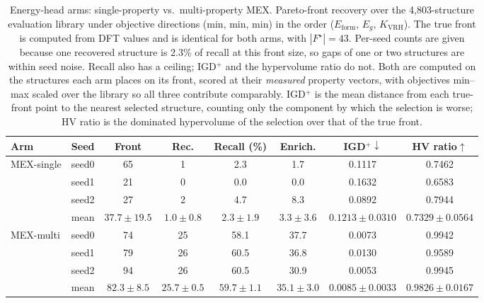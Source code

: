 \begin{table}[htbp]
\renewcommand{\arraystretch}{1.2}
\setlength{\tabcolsep}{4pt}
\caption{Energy-head arms: single-property vs.\ multi-property MEX. Pareto-front recovery over the 4{,}803-structure evaluation library under objective directions (min, min, min) in the order ($E_\mathrm{form}$, $E_g$, $K_\mathrm{VRH}$). The true front is computed from DFT values and is identical for both arms, with $|F^\star|{=}43$. Per-seed counts are given because one recovered structure is 2.3\% of recall at this front size, so gaps of one or two structures are within seed noise. Recall also has a ceiling; IGD$^+$ and the hypervolume ratio do not. Both are computed on the structures each arm places on its front, scored at their \emph{measured} property vectors, with objectives min--max scaled over the library so all three contribute comparably. IGD$^+$ is the mean distance from each true-front point to the nearest selected structure, counting only the component by which the selection is worse; HV ratio is the dominated hypervolume of the selection over that of the true front.}
\label{tab:pareto_arms_mex_heldout}
\centering
\footnotesize
\begin{tabular}{@{}llcccccc@{}}
\hline\hline
\textbf{Arm} & \textbf{Seed} & \textbf{Front} & \textbf{Rec.} & \textbf{Recall (\%)} & \textbf{Enrich.} & \textbf{IGD$^+\downarrow$} & \textbf{HV ratio$\uparrow$} \\
\hline
\multirow{4}{*}{MEX-single}
  & seed0 & 65 & 1 & 2.3 & 1.7 & 0.1117 & 0.7462 \\
  & seed1 & 21 & 0 & 0.0 & 0.0 & 0.1632 & 0.6583 \\
  & seed2 & 27 & 2 & 4.7 & 8.3 & 0.0892 & 0.7944 \\
  & mean & $37.7 \pm 19.5$ & $1.0 \pm 0.8$ & $2.3 \pm 1.9$ & $3.3 \pm 3.6$ & $0.1213 \pm 0.0310$ & $0.7329 \pm 0.0564$ \\
\hline
\multirow{4}{*}{MEX-multi}
  & seed0 & 74 & 25 & 58.1 & 37.7 & 0.0073 & 0.9942 \\
  & seed1 & 79 & 26 & 60.5 & 36.8 & 0.0130 & 0.9589 \\
  & seed2 & 94 & 26 & 60.5 & 30.9 & 0.0053 & 0.9945 \\
  & mean & $82.3 \pm 8.5$ & $25.7 \pm 0.5$ & $59.7 \pm 1.1$ & $35.1 \pm 3.0$ & $0.0085 \pm 0.0033$ & $0.9826 \pm 0.0167$ \\
\hline\hline
\end{tabular}
\end{table}
